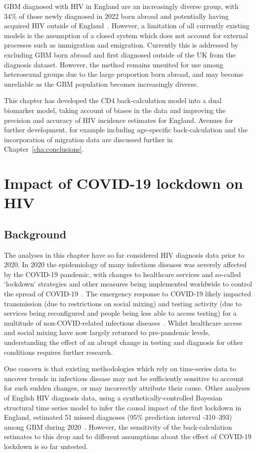 GBM diagnosed with HIV in England are an increasingly diverse group, with 34\% of those newly diagnosed in 2022 born abroad and potentially having acquired HIV outside of England~\parencite{Martin2023-um}. However, a limitation of all currently existing models is the assumption of a closed system which does not account for external processes such as immigration and emigration. Currently this is addressed by excluding GBM born abroad and first diagnosed outside of the UK from the diagnosis dataset. However, the method remains unsuited for use among heterosexual groups due to the large proportion born abroad, and may become unreliable as the GBM population becomes increasingly diverse.

This chapter has developed the CD4 back-calculation model into a dual biomarker model, taking account of biases in the data and improving the precision and accuracy of HIV incidence estimates for England. Avenues for further development, for example including age-specific back-calculation and the incorporation of migration data are discussed further in Chapter~\ref{cha:conclusions}.

\section{Impact of COVID-19 lockdown on HIV}

\subsection{Background}

The analyses in this chapter have so far considered HIV diagnosis data prior to 2020. In 2020 the epidemiology of many infectious diseases was severely affected by the COVID-19 pandemic, with changes to healthcare services and so-called `lockdown' strategies and other measures being implemented worldwide to control the spread of COVID-19~\parencite{Institute_for_Government2022-zw}. The emergency response to COVID-19 likely impacted transmission (due to restrictions on social mixing) and testing activity (due to services being reconfigured and people being less able to access testing) for a multitude of non-COVID-related infectious diseases~\parencite{Mude2023-ec, Simoes2020-ri}. Whilst healthcare access and social mixing have now largely returned to pre-pandemic levels, understanding the effect of an abrupt change in testing and diagnosis for other conditions requires further research.

One concern is that existing methodologies which rely on time-series data to uncover trends in infectious disease may not be sufficiently sensitive to account for such sudden changes, or may incorrectly attribute their cause. Other analyses of English HIV diagnosis data, using a synthetically-controlled Bayesian structural time series model to infer the causal impact of the first lockdown in England, estimated 51 missed diagnoses (95\% prediction interval -310--393) among GBM during 2020~\parencite{Muhammed2024-dw}. However, the sensitivity of the back-calculation estimates to this drop and to different assumptions about the effect of COVID-19 lockdown is so far untested.

